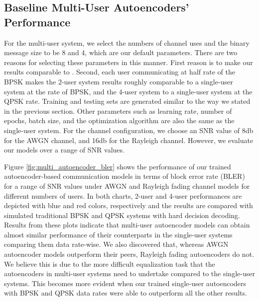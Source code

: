 \subsection{Baseline Multi-User Autoencoders' Performance}
For the multi-user system, we select the numbers of channel uses and the binary message size to be 8 and 4, which are our default parameters. There are two reasons for selecting these parameters in this manner. First reason is to make our results comparable to \cite{o2017introduction}. Second, each user communicating at half rate of the BPSK makes the 2-user system results roughly comparable to a single-user system at the rate of BPSK, and the 4-user system to a single-user system at the QPSK rate. Training and testing sets are generated similar to the way we stated in the previous section. Other parameters such as learning rate, number of epochs, batch size, and the optimization algorithm are also the same as the single-user system. For the channel configuration, we choose an SNR value of 8db for the AWGN channel, and 16db for the Rayleigh channel. However, we evaluate our models over a range of SNR values.

Figure \ref{fig:multi_autoencoder_bler} shows the performance of our trained autoencoder-based communication models in terms of block error rate (BLER) for a range of SNR values under AWGN and Rayleigh fading channel models for different numbers of users. In both charts, 2-user and 4-user performances are depicted with blue and red colors, respectively and the results are compared with simulated traditional BPSK and QPSK systems with hard decision decoding. Results from these plots indicate that multi-user autoencoder models can obtain almost similar performance of their counterparts in the single-user systems comparing them data rate-wise. We also discovered that, whereas AWGN autoencoder models outperform their peers, Rayleigh fading autoencoders do not. We believe this is due to the more difficult equalization task that the autoencoders in multi-user systems need to undertake compared to the single-user systems. This becomes more evident when our trained single-user autoencoders with BPSK and QPSK data rates were able to outperform all the other results.

